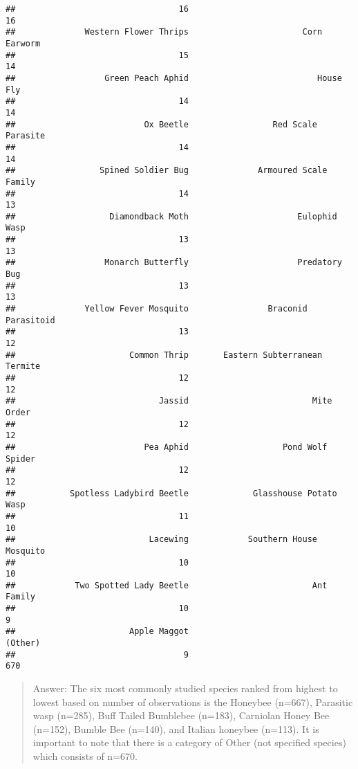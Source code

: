 \documentclass[
]{article}
\begin{document}
\begin{verbatim}
##                                 16                                 16 
##              Western Flower Thrips                       Corn Earworm 
##                                 15                                 14 
##                  Green Peach Aphid                          House Fly 
##                                 14                                 14 
##                          Ox Beetle                 Red Scale Parasite 
##                                 14                                 14 
##                 Spined Soldier Bug              Armoured Scale Family 
##                                 14                                 13 
##                   Diamondback Moth                      Eulophid Wasp 
##                                 13                                 13 
##                  Monarch Butterfly                      Predatory Bug 
##                                 13                                 13 
##              Yellow Fever Mosquito                Braconid Parasitoid 
##                                 13                                 12 
##                       Common Thrip       Eastern Subterranean Termite 
##                                 12                                 12 
##                             Jassid                         Mite Order 
##                                 12                                 12 
##                          Pea Aphid                   Pond Wolf Spider 
##                                 12                                 12 
##           Spotless Ladybird Beetle             Glasshouse Potato Wasp 
##                                 11                                 10 
##                           Lacewing            Southern House Mosquito 
##                                 10                                 10 
##            Two Spotted Lady Beetle                         Ant Family 
##                                 10                                  9 
##                       Apple Maggot                            (Other) 
##                                  9                                670
\end{verbatim}

\begin{quote}
Answer: The six most commonly studied species ranked from highest to
lowest based on number of observations is the Honeybee (n=667),
Parasitic wasp (n=285), Buff Tailed Bumblebee (n=183), Carniolan Honey
Bee (n=152), Bumble Bee (n=140), and Italian honeybee (n=113). It is
important to note that there is a category of Other (not specified
species) which consists of n=670.
\end{quote}
\end{document}
